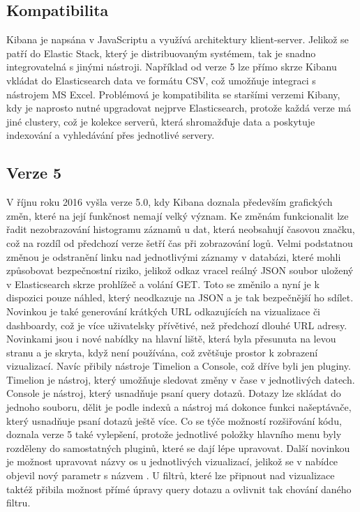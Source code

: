\documentclass[czech,BP]{thesiskiv2}
\begin{document}
 \subsection{Kompatibilita}
	Kibana je napsána v JavaScriptu a využívá architektury klient-server. Jelikož se patří do Elastic Stack, který je distribuovaným systémem, tak je snadno integrovatelná s jinými nástroji. Například od verze 5 lze přímo skrze Kibanu vkládat do Elasticsearch data ve formátu CSV, což umožňuje integraci s nástrojem MS Excel. Problémová je kompatibilita se staršími verzemi Kibany, kdy je naprosto nutné upgradovat nejprve Elasticsearch, protože každá verze má jiné clustery, což je kolekce serverů, která shromažďuje data a poskytuje indexování a vyhledávání přes jednotlivé servery.
 
 \subsection{Verze 5}
 V říjnu roku 2016 vyšla verze 5.0, kdy Kibana doznala především grafických změn, které na její funkčnost nemají velký význam. Ke změnám funkcionalit lze řadit nezobrazování histogramu záznamů u dat, která neobsahují časovou značku, což na rozdíl od předchozí verze šetří čas při zobrazování logů. Velmi podstatnou změnou je odstranění linku nad jednotlivými záznamy v databázi, které mohli způsobovat bezpečnostní riziko, jelikož odkaz vracel reálný JSON soubor uložený v Elasticsearch skrze prohlížeč a volání GET. Toto se změnilo a nyní je k dispozici pouze náhled, který neodkazuje na JSON a je tak bezpečnější ho sdílet. Novinkou je také generování krátkých URL odkazujících na vizualizace či dashboardy, což je více uživatelsky přívětivé, než předchozí dlouhé URL adresy. Novinkami jsou i nové nabídky na hlavní liště, která byla přesunuta na levou stranu a je skryta, když není používána, což zvětšuje prostor k zobrazení vizualizací. Navíc přibily nástroje Timelion a Console, což dříve byli jen pluginy. Timelion je nástroj, který umožňuje sledovat změny v čase v jednotlivých datech. Console je nástroj, který usnadňuje psaní query dotazů. Dotazy lze skládat do jednoho souboru, dělit je podle indexů a nástroj má dokonce funkci našeptávače, který usnadňuje psaní dotazů  ještě více. Co se týče možností rozšiřování kódu, doznala verze 5 také vylepšení, protože jednotlivé položky hlavního menu byly rozděleny do samostatných pluginů, které se dají lépe upravovat. Další novinkou je možnost upravovat názvy os u jednotlivých vizualizací, jelikož se v nabídce objevil nový parametr s názvem . U filtrů, které lze připnout nad vizualizace taktéž přibila možnost přímé úpravy query dotazu a ovlivnit tak chování daného filtru. \cite{Kibana5intro}
 
\end{document}
